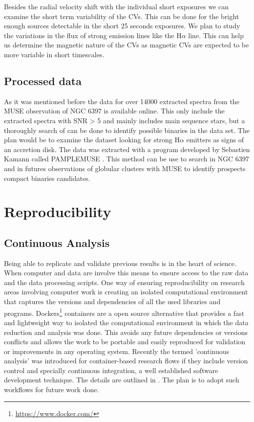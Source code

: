 Besides the radial velocity shift with the individual short exposures we can examine the short term variability of the CVs. This can be done for the bright enough sources detectable in the short 25 seconds exposures. We plan to study the variations in the flux of strong emission lines like the H$\alpha$ line. This can help us determine the magnetic nature of the CVs as magnetic CVs are expected to be more variable in short timescales. 

\subsection{Processed data}

As it was mentioned before the data for over 14000 extracted spectra from the MUSE observation of NGC 6397 is available online. This only include the extracted spectra with SNR > 5 and mainly includes main sequence stars, but a thoroughly search of can be done to identify possible binaries in the data set. The plan would be to examine the dataset looking for strong H$\alpha$ emitters as signs of an accretion disk. The data was extracted with a program developed by Sebastien Kamann called PAMPLEMUSE \citep{2013A&A...549A..71K}. This method can be use  to search in NGC 6397 and in futures observations of globular clusters with MUSE to identify prospects compact binaries candidates. 


\section{Reproducibility}


\subsection{Continuous Analysis}


Being able to replicate and validate previous results is in the heart of science. When computer and data are involve this means to ensure access to the raw data and the data processing scripts. One way of ensuring reproducibility on research areas involving computer work is creating an isolated computational environment that captures the versions and dependencies of all the used libraries and programs. Dockers\footnote{\url{https://www.docker.com/}} containers are a open source alternative that provides a fast and lightweight way to isolated the computational environment in which the data reduction and analysis was done. This  avoids any future dependencies or versions conflicts and allows the work to be portable and easily reproduced for validation or improvements in any operating system. Recently the termed 'continuous analysis' was introduced for container-based research flows if they include version control and specially continuous integration, a well established software development technique. The details are outlined in \cite{Beaulieu-Jones056473}. The plan is to adopt such workflows for future work done.   

